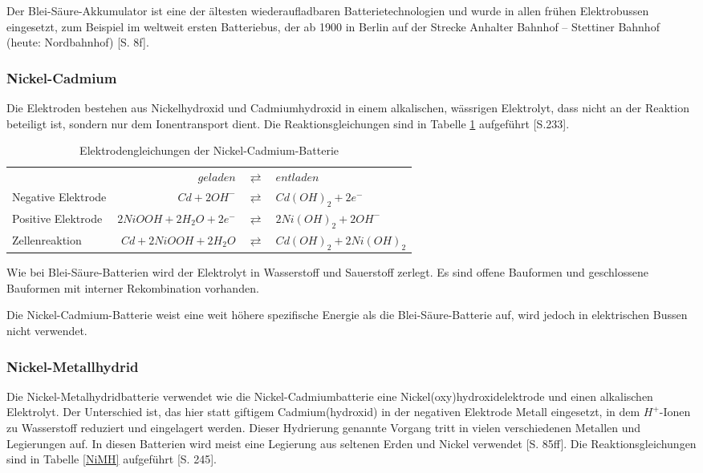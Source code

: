 Der Blei-Säure-Akkumulator ist eine der ältesten wiederaufladbaren Batterietechnologien und wurde in allen frühen Elektrobussen eingesetzt, zum Beispiel im weltweit ersten Batteriebus, der ab 1900 in Berlin auf der Strecke Anhalter Bahnhof – Stettiner Bahnhof (heute: Nordbahnhof) \cite{Risch:1957}[S. 8f].

\subsubsection{Nickel-Cadmium}
Die Elektroden bestehen aus Nickelhydroxid und Cadmiumhydroxid in einem alkalischen, wässrigen Elektrolyt, dass nicht an der Reaktion beteiligt ist, sondern nur dem Ionentransport dient. Die Reaktionsgleichungen sind in Tabelle \ref{NiCd} aufgeführt \cite{Sterner:2014}[S.233].

\begin{table}\centering
	\begin{tabularx}{\linewidth}{XrcX}
		&               $geladen$ & $\rightleftarrows$ & $entladen$             \\
		Negative Elektrode &            $Cd + 2OH^-$ & $\rightleftarrows$ & $Cd(OH)_2 + 2e^-$      \\
		Positive Elektrode & $2NiOOH + 2H_2O + 2e^-$ & $\rightleftarrows$ & $2Ni(OH)_2 + 2OH^-$    \\ \midrule
		Zellenreaktion     &   $Cd + 2NiOOH + 2H_2O$ & $\rightleftarrows$ & $Cd(OH)_2 + 2Ni(OH)_2$ \\
	\end{tabularx}
	\caption{Elektrodengleichungen der Nickel-Cadmium-Batterie}
	\label{NiCd}
\end{table}

Wie bei Blei-Säure-Batterien wird der Elektrolyt in Wasserstoff und Sauerstoff zerlegt. Es sind offene Bauformen und geschlossene Bauformen mit interner Rekombination vorhanden.

Die Nickel-Cadmium-Batterie weist eine weit höhere spezifische Energie als die Blei-Säure-Batterie auf, wird jedoch in elektrischen Bussen nicht verwendet. 

\subsubsection{Nickel-Metallhydrid}
Die Nickel-Metalhydridbatterie verwendet wie die Nickel-Cadmiumbatterie eine Nickel(oxy)hydroxidelektrode und einen alkalischen Elektrolyt. Der Unterschied ist, das hier statt giftigem Cadmium(hydroxid) in der negativen Elektrode Metall eingesetzt, in dem $H^+$-Ionen zu Wasserstoff reduziert und eingelagert werden. Dieser Hydrierung genannte Vorgang tritt in vielen verschiedenen Metallen und Legierungen auf. In diesen Batterien wird meist eine Legierung aus seltenen Erden und Nickel verwendet \cite{KiehneBattery}[S. 85ff]. Die Reaktionsgleichungen sind in Tabelle \ref{NiMH} aufgeführt \cite{Sterner:2014}[S. 245].

